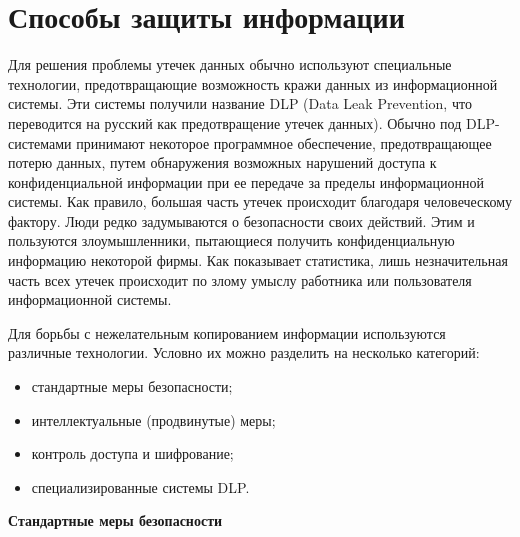 \section{Способы защиты информации}

Для решения проблемы утечек данных обычно используют специальные технологии, предотвращающие возможность кражи данных из информационной системы. Эти системы получили название DLP (Data Leak Prevention, что переводится на русский как предотвращение утечек данных). Обычно под DLP-системами принимают некоторое программное обеспечение, предотвращающее потерю данных, путем обнаружения возможных нарушений доступа к конфиденциальной информации при ее передаче за пределы информационной системы. Как правило, большая часть утечек происходит благодаря человеческому фактору. Люди редко задумываются о безопасности своих действий. Этим и пользуются злоумышленники, пытающиеся получить конфиденциальную информацию некоторой фирмы. Как показывает статистика, лишь незначительная часть всех утечек происходит по злому умыслу работника или пользователя информационной системы.

Для борьбы с нежелательным копированием информации используются различные технологии. Условно их можно разделить на несколько категорий:

\begin{itemize}
	\item
		стандартные меры безопасности;
	\item
		интеллектуальные (продвинутые) меры;
	\item
		контроль доступа и шифрование;
	\item
		специализированные системы DLP.
\end{itemize}

\textbf{Стандартные меры безопасности}

